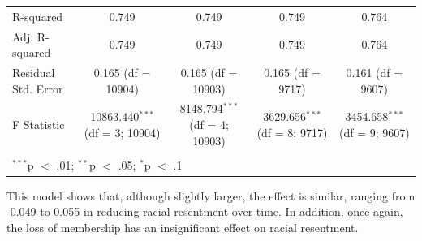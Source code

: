 \documentclass[12pt,letterpaper]{article}
\begin{document}
\begin{table}[H]
{\begin{tabular}{@{\extracolsep{5pt}}lcccc}
			R-squared & 0.749 & 0.749 & 0.749 & 0.764 \\ 
			Adj. R-squared & 0.749 & 0.749 & 0.749 & 0.764 \\ 
			Residual Std. Error & 0.165 (df = 10904) & 0.165 (df = 10903) & 0.165 (df = 9717) & 0.161 (df = 9607) \\ 
			F Statistic & 10863.440$^{***}$ (df = 3; 10904) & 8148.794$^{***}$ (df = 4; 10903) & 3629.656$^{***}$ (df = 8; 9717) & 3454.658$^{***}$ (df = 9; 9607) \\ 
			\hline \\[-1.8ex] 
			\multicolumn{5}{l}{$^{***}$p $<$ .01; $^{**}$p $<$ .05; $^{*}$p $<$ .1} \\ 
		\end{tabular} 
	}
	
	 This model shows that, although slightly larger, the effect is similar, ranging from -0.049 to 0.055 in reducing racial resentment over time. In addition, once again, the loss of membership has an insignificant effect on racial resentment.
	 
\end{table} 
\end{document}

